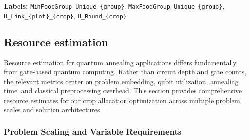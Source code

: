 \documentclass{oqireport}
\begin{document}
\textbf{Labels:} \texttt{MinFoodGroup\_Unique\_\{group\}}, \texttt{MaxFoodGroup\_Unique\_\{group\}}, \texttt{U\_Link\_\{plot\}\_\{crop\}}, \texttt{U\_Bound\_\{crop\}}











\clearpage


\subsection{Resource estimation}

Resource estimation for quantum annealing applications differs fundamentally from gate-based quantum computing. Rather than circuit depth and gate counts, the relevant metrics center on problem embedding, qubit utilization, annealing time, and classical preprocessing overhead. This section provides comprehensive resource estimates for our crop allocation optimization across multiple problem scales and solution architectures.

\subsubsection{Problem Scaling and Variable Requirements}
\end{document}
